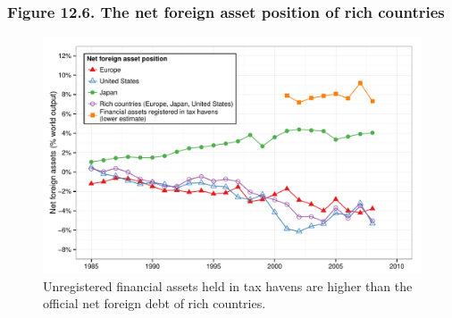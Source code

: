 \documentclass[t]{beamer}\usepackage[]{graphicx}\usepackage[]{color}
\newenvironment{knitrout}{}{} %
\begin{document}
\begin{frame}[label=Figure_12_6]
\frametitle{Figure 12.6. The net foreign asset position of rich countries}
\begin{figure}[t]
\begin{minipage}[b]{\textwidth}
\centering
\begin{knitrout}\footnotesize
{}\color{fgcolor}

{\centering \includegraphics[width=1\linewidth]{figures/color/Figure_12_6} 

}



\end{knitrout}
\caption{Unregistered financial assets held in tax havens are higher than the official net foreign debt of rich countries.}
\end{minipage}
\end{figure}
\end{frame}
\end{document}
